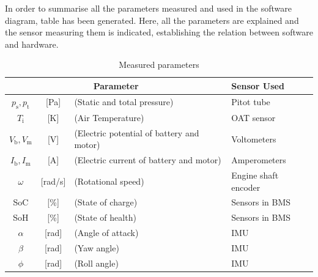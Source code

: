 In order to summarise all the parameters measured and used in the software diagram, table  has been generated. Here, all the parameters are explained and the sensor measuring them is indicated, establishing the relation between software and hardware.


\begin{table}[H]
\centering
\caption{Measured parameters}
\label{tab:sensors}
\begin{tabular}{ccl|l}
\toprule
\multicolumn{3}{c|}{\textbf{Parameter}} & \textbf{Sensor Used}                \\ \midrule

$p_\text{s}, p_\text{t}$                & {[}Pa{]}                                        & (Static and total pressure)               & Pitot tube              \\
$T_\text{i}$                            & {[}K{]}                                         & (Air Temperature)                         & OAT sensor             \\
$V_\text{b}, V_\text{m}$                & {[}V{]}                                         & (Electric potential of battery and motor) & Voltometers      \\
$I_\text{b}, I_\text{m}$                & {[}A{]}                                         & (Electric current of battery and motor)   & Amperometers     \\
$\omega$                                & {[}rad/s{]}                                    & (Rotational speed)                        & Engine shaft encoder                     \\
SoC                                     & {[}\%{]}                                        & (State of charge)                         & Sensors in BMS                                     \\
SoH                                     & {[}\%{]}                                        & (State of health)                         & Sensors in BMS                                     \\
$\alpha$                                & {[}rad{]}                                       & (Angle of attack)                         & IMU                                      \\
$\beta$                                 & {[}rad{]}                                       & (Yaw angle)                               & IMU                                      \\
$\phi$                                  & {[}rad{]}                                       & (Roll angle)                              & IMU                                      \\

\end{tabular}
\end{table}

